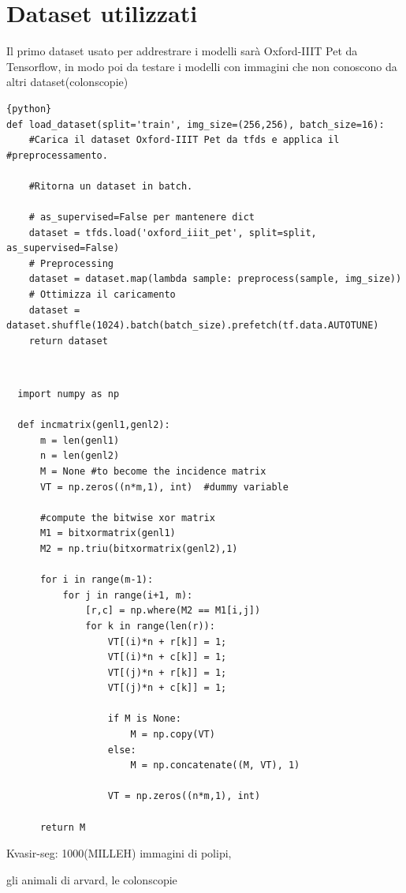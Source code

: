\documentclass[12pt,a4paper,openright,twoside]{book}
\newcommand{\TODOComment}[1]{}
\begin{document}
\section{Dataset utilizzati}
Il primo dataset usato per addrestrare i modelli sarà Oxford-IIIT Pet da Tensorflow, in modo poi da testare i modelli con immagini che non conoscono da altri dataset(colonscopie)\\
\begin{lstlisting}{python}
def load_dataset(split='train', img_size=(256,256), batch_size=16):
    #Carica il dataset Oxford-IIIT Pet da tfds e applica il #preprocessamento.

    #Ritorna un dataset in batch.

    # as_supervised=False per mantenere dict
    dataset = tfds.load('oxford_iiit_pet', split=split, as_supervised=False) 
    # Preprocessing
    dataset = dataset.map(lambda sample: preprocess(sample, img_size))  
    # Ottimizza il caricamento
    dataset = dataset.shuffle(1024).batch(batch_size).prefetch(tf.data.AUTOTUNE)  
    return dataset
\end{lstlisting}\\

\begin{verbatim}
  import numpy as np
      
  def incmatrix(genl1,genl2):
      m = len(genl1)
      n = len(genl2)
      M = None #to become the incidence matrix
      VT = np.zeros((n*m,1), int)  #dummy variable
      
      #compute the bitwise xor matrix
      M1 = bitxormatrix(genl1)
      M2 = np.triu(bitxormatrix(genl2),1) 
  
      for i in range(m-1):
          for j in range(i+1, m):
              [r,c] = np.where(M2 == M1[i,j])
              for k in range(len(r)):
                  VT[(i)*n + r[k]] = 1;
                  VT[(i)*n + c[k]] = 1;
                  VT[(j)*n + r[k]] = 1;
                  VT[(j)*n + c[k]] = 1;
                  
                  if M is None:
                      M = np.copy(VT)
                  else:
                      M = np.concatenate((M, VT), 1)
                  
                  VT = np.zeros((n*m,1), int)
      
      return M
\end{verbatim}

Kvasir-seg: 1000(MILLEH) immagini di polipi, 

gli animali di arvard, le colonscopie \TODOComment{Approfondire aggiungendo link ai dataset e approfondire cose che non ci sono}
\end{document}
